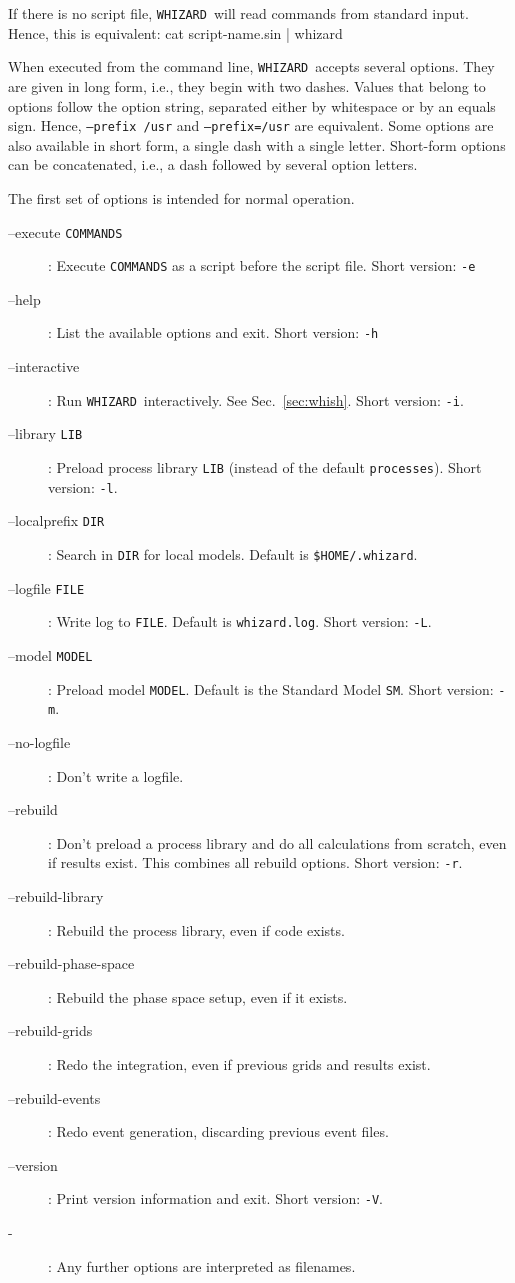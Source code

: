 \documentclass[12pt]{book}
\newenvironment{interaction}%
  {\begingroup\small
   \verbatim}%
  {\endverbatim
   \endgroup\noindent}
\newcommand{\ttt}[1]{\texttt{#1}}
\newcommand{\whizard}{\texttt{WHIZARD}}
\begin{document}
If there is no script file, \whizard\ will read commands from standard
input.  Hence, this is equivalent:
\begin{interaction}
  cat script-name.sin | whizard
\end{interaction}

When executed from the command line, \whizard\ accepts several options.
They are given in long form, i.e., they begin with two dashes.  Values
that belong to options follow the option string, separated either by
whitespace or by an equals sign.  Hence, \ttt{--prefix /usr} and
\ttt{--prefix=/usr} are equivalent.  Some options are also available
in short form, a single dash with a single letter.  Short-form options
can be concatenated, i.e., a dash followed by several option letters.

The first set of options is intended for normal operation.
\begin{description}
\item[--execute \ttt{COMMANDS}]:  Execute \ttt{COMMANDS} as a script
  before the script file.  Short version: \ttt{-e}
\item[--help]:  List the available options and exit.  Short version:
  \ttt{-h}
\item[--interactive]:  Run \whizard\ interactively.  See
  Sec.~\ref{sec:whish}.  Short version: \ttt{-i}.
\item[--library \ttt{LIB}]:  Preload process library \ttt{LIB}
  (instead of the default \ttt{processes}).  Short version: \ttt{-l}.
\item[--localprefix \ttt{DIR}]:  Search in \ttt{DIR} for local
  models.  Default is \ttt{\$HOME/.whizard}.
\item[--logfile \ttt{FILE}]: Write log to \ttt{FILE}.  Default is
  \ttt{whizard.log}.  Short version: \ttt{-L}.
\item[--model \ttt{MODEL}]: Preload model \ttt{MODEL}.  Default is the
  Standard Model \ttt{SM}.  Short version: \ttt{-m}.
\item[--no-logfile]: Don't write a logfile.
\item[--rebuild]: Don't preload a process library and do all
  calculations from scratch, even if results exist.  This combines all
  rebuild options.  Short version: \ttt{-r}.
\item[--rebuild-library]: Rebuild the process library, even if code
  exists.
\item[--rebuild-phase-space]: Rebuild the phase space setup, even if
  it exists.
\item[--rebuild-grids]: Redo the integration, even if previous grids
  and results exist.
\item[--rebuild-events]: Redo event generation, discarding previous
  event files.
\item[--version]: Print version information and exit.  Short version:
  \ttt{-V}.
\item[-]: Any further options are interpreted as filenames.
\end{description}
\end{document}
